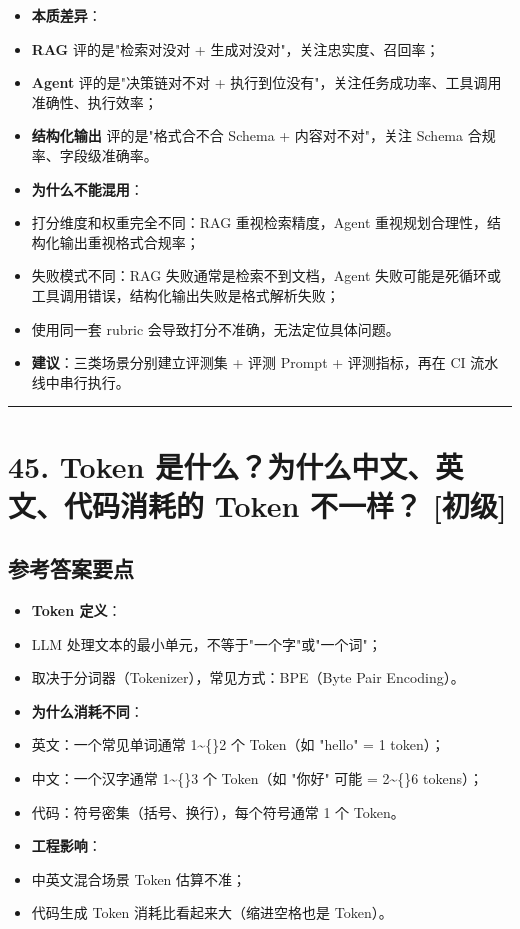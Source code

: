 \documentclass[9pt,a4paper,twocolumn]{ctexart}
\newcommand{\lvchu}{\usebox{\badgechubox}}
\def\lvchu{[初级]}%
\begin{document}
\begin{itemize}[itemsep=1pt, topsep=2pt]
  \item \textbf{本质差异}：
  \item \textbf{RAG} 评的是"检索对没对 + 生成对没对"，关注忠实度、召回率；
  \item \textbf{Agent} 评的是"决策链对不对 + 执行到位没有"，关注任务成功率、工具调用准确性、执行效率；
  \item \textbf{结构化输出} 评的是"格式合不合 Schema + 内容对不对"，关注 Schema 合规率、字段级准确率。
  \item \textbf{为什么不能混用}：
  \item 打分维度和权重完全不同：RAG 重视检索精度，Agent 重视规划合理性，结构化输出重视格式合规率；
  \item 失败模式不同：RAG 失败通常是检索不到文档，Agent 失败可能是死循环或工具调用错误，结构化输出失败是格式解析失败；
  \item 使用同一套 rubric 会导致打分不准确，无法定位具体问题。
  \item \textbf{建议}：三类场景分别建立评测集 + 评测 Prompt + 评测指标，再在 CI 流水线中串行执行。
\end{itemize}


\vspace{2pt}
\noindent\rule{\columnwidth}{0.3pt}\vspace{2pt}





\section*{45. Token 是什么？为什么中文、英文、代码消耗的 Token 不一样？ \lvchu{}}


\subsection*{参考答案要点}

\begin{itemize}[itemsep=1pt, topsep=2pt]
  \item \textbf{Token 定义}：
  \item LLM 处理文本的最小单元，不等于"一个字"或"一个词"；
  \item 取决于分词器（Tokenizer），常见方式：BPE（Byte Pair Encoding）。
  \item \textbf{为什么消耗不同}：
  \item 英文：一个常见单词通常 1\textasciitilde\{\}2 个 Token（如 "hello" = 1 token）；
  \item 中文：一个汉字通常 1\textasciitilde\{\}3 个 Token（如 "你好" 可能 = 2\textasciitilde\{\}6 tokens）；
  \item 代码：符号密集（括号、换行），每个符号通常 1 个 Token。
  \item \textbf{工程影响}：
  \item 中英文混合场景 Token 估算不准；
  \item 代码生成 Token 消耗比看起来大（缩进空格也是 Token）。
\end{itemize}
\end{document}
